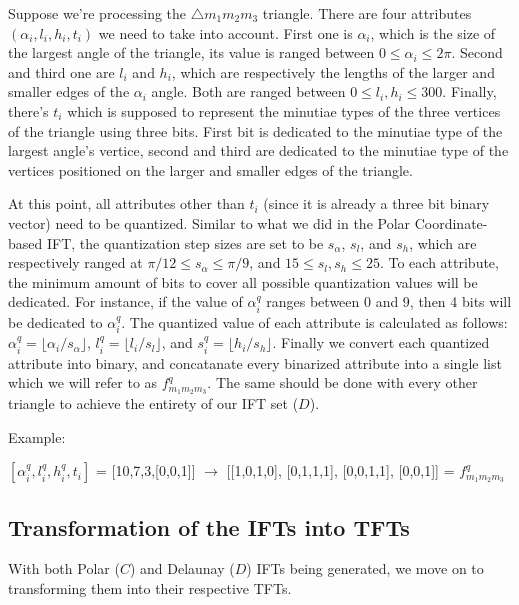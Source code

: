 \documentclass[fyp]{socreport}
\begin{document}
Suppose we're processing the $\triangle m_1m_2m_3$ triangle. There are four attributes $(\alpha_i, l_i, h_i, t_i)$ we need to take into account. First one is $\alpha_i$, which is the size of the largest angle of the triangle, its value is ranged between $0 \le \alpha_i \le 2\pi$. Second and third one are $l_i$ and $h_i$, which are respectively the lengths of the larger and smaller edges of the $\alpha_i$ angle. Both are ranged between $0 \le l_i, h_i \le 300$. Finally, there's $t_i$ which is supposed to represent the minutiae types of the three vertices of the triangle using three bits. First bit is dedicated to the minutiae type of the largest angle's vertice, second and third are dedicated to the minutiae type of the vertices positioned on the larger and smaller edges of the triangle.

At this point, all attributes other than $t_i$ (since it is already a three bit binary vector) need to be quantized. Similar to what we did in the Polar Coordinate-based IFT, the quantization step sizes are set to be $s_{\alpha}$, $s_l$, and $s_h$, which are respectively ranged at $\pi/12 \leq s_{\alpha} \leq \pi/9$, and $15 \leq s_l, s_h \leq 25$. To each attribute, the minimum amount of bits to cover all possible quantization values will be dedicated. For instance, if the value of $\alpha^q_i$ ranges between 0 and 9, then 4 bits will be dedicated to $\alpha^q_i$. The quantized value of each attribute is calculated as follows: $\alpha^q_i = \lfloor \alpha_i / s_{\alpha}\rfloor$, $l^q_i = \lfloor l_i / s_l\rfloor$, and $s^q_i = \lfloor h_i / s_h\rfloor$. Finally we convert each quantized attribute into binary, and concatanate every binarized attribute into a single list which we will refer to as $f^q_{m_1m_2m_3}$. The same should be done with every other triangle to achieve the entirety of our IFT set ($D$).

\begin{center}
	Example:
	
	$[\alpha^q_i, l^q_i, h^q_i, t_i]$ = [10,7,3,[0,0,1]] $\to$ [[1,0,1,0], [0,1,1,1], [0,0,1,1], [0,0,1]] = $f^q_{m_1m_2m_3}$
\end{center}

\subsection{Transformation of the IFTs into TFTs}
With both Polar ($C$) and Delaunay ($D$) IFTs being generated, we move on to transforming them into their respective TFTs.
\end{document}
